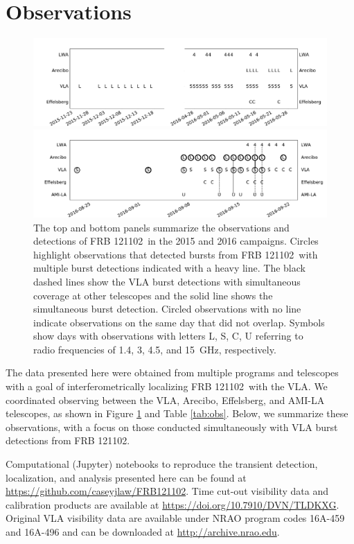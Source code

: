 \documentclass[twocolumn]{aastex61}
\newcommand{\frb}{FRB 121102}
\begin{document}
\section{Observations}
\label{sec:obs}

\begin{figure}[t]
\begin{center}
\includegraphics[width=2\columnwidth]{timeline0}

\includegraphics[width=2\columnwidth]{timeline}
\caption{The top and bottom panels summarize the observations and detections of \frb\ in the 2015 and 2016 campaigns. Circles highlight observations that detected bursts from \frb\ with multiple burst detections indicated with a heavy line. The black dashed lines show the VLA burst detections with simultaneous coverage at other telescopes and the solid line shows the simultaneous burst detection. Circled observations with no line indicate observations on the same day that did not overlap. Symbols show days with observations with letters L, S, C, U referring to radio frequencies of 1.4, 3, 4.5, and 15~GHz, respectively.
\label{fig:sched}}
\end{center}
\end{figure}

The data presented here were obtained from multiple programs and telescopes with a goal of interferometrically localizing \frb\ with the VLA. We coordinated observing between the VLA, Arecibo, Effelsberg, and AMI-LA telescopes, as shown in Figure \ref{fig:sched} and Table \ref{tab:obs}. Below, we summarize these observations, with a focus on those conducted simultaneously with VLA burst detections from \frb.

Computational (Jupyter) notebooks to reproduce the transient detection, localization, and analysis presented here can be found at \url{https://github.com/caseyjlaw/FRB121102}. Time cut-out visibility data and calibration products are available at \url{https://doi.org/10.7910/DVN/TLDKXG}. Original VLA visibility data are available under NRAO program codes 16A-459 and 16A-496 and can be downloaded at \url{http://archive.nrao.edu}.
\end{document}
